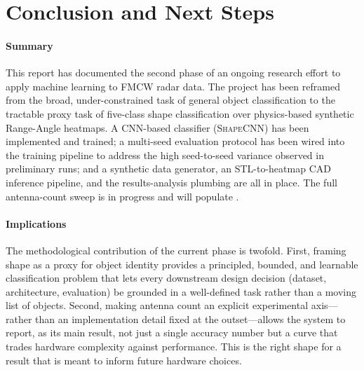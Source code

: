 \documentclass[letterpaper,11pt,leqno]{article}
\begin{document}
\section{Conclusion and Next Steps}\label{s:conclusion}

\paragraph{Summary} This report has documented the second phase of an ongoing research effort to apply machine learning to FMCW radar data. The project has been reframed from the broad, under-constrained task of general object classification to the tractable proxy task of five-class shape classification over physics-based synthetic Range-Angle heatmaps. A CNN-based classifier (\textsc{ShapeCNN}) has been implemented and trained; a multi-seed evaluation protocol has been wired into the training pipeline to address the high seed-to-seed variance observed in preliminary runs; and a synthetic data generator, an STL-to-heatmap CAD inference pipeline, and the results-analysis plumbing are all in place. The full antenna-count sweep is in progress and will populate .

\paragraph{Implications} The methodological contribution of the current phase is twofold. First, framing shape as a proxy for object identity provides a principled, bounded, and learnable classification problem that lets every downstream design decision (dataset, architecture, evaluation) be grounded in a well-defined task rather than a moving list of objects. Second, making antenna count an explicit experimental axis---rather than an implementation detail fixed at the outset---allows the system to report, as its main result, not just a single accuracy number but a curve that trades hardware complexity against performance. This is the right shape for a result that is meant to inform future hardware choices.
\end{document}
